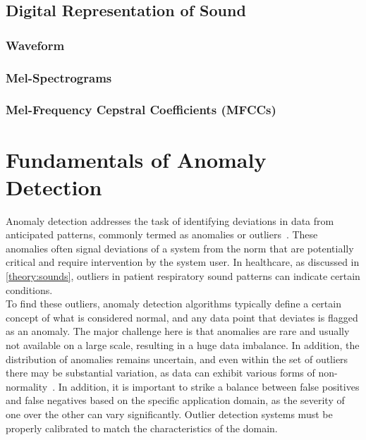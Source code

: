 \subsection{Digital Representation of Sound}
\subsubsection{Waveform}
\subsubsection{Mel-Spectrograms}
\subsubsection{Mel-Frequency Cepstral Coefficients (MFCCs)}

\section{Fundamentals of Anomaly Detection}
Anomaly detection addresses the task of identifying deviations in data from anticipated patterns, commonly termed as anomalies or outliers~\cite{chandola2009anomaly}. These anomalies often signal deviations of a system from the norm that are potentially critical and require intervention by the system user. In healthcare, as discussed in \autoref{theory:sounds}, outliers in patient respiratory sound patterns can indicate certain conditions. \\
To find these outliers, anomaly detection algorithms typically define a certain concept of what is considered normal, and any data point that deviates is flagged as an anomaly. The major challenge here is that anomalies are rare and usually not available on a large scale, resulting in a huge data imbalance. In addition, the distribution of anomalies remains uncertain, and even within the set of outliers there may be substantial variation, as data can exhibit various forms of non-normality~\cite{pang2021deep}. In addition, it is important to strike a balance between false positives and false negatives based on the specific application domain, as the severity of one over the other can vary significantly. Outlier detection systems must be properly calibrated to match the characteristics of the domain.\\
